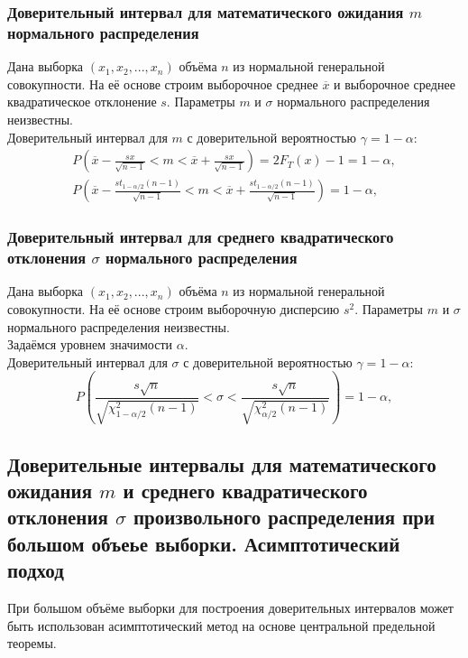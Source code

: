 	\subsubsection {Доверительный интервал для математического ожидания $m$ нормального распределения}
		Дана выборка $(x_1, x_2, ..., x_n)$ объёма $n$ из нормальной генеральной совокупности. На её основе строим выборочное среднее $\overline x$ и выборочное среднее квадратическое отклонение $s$. Параметры $m$ и $\sigma$ нормального распределения неизвестны.\\
		Доверительный интервал для $m$ с доверительной вероятностью $\gamma = 1 - \alpha$:\\
		\begin{eqnarray}
			P\left(\overline x - \frac{sx}{\sqrt{n - 1}} < m < \overline x + \frac{sx}{\sqrt{n - 1}}\right) = 2F_T(x) - 1 = 1 - \alpha, \\ \nonumber
			P\left(\overline x - \frac{st_{1 - \alpha/2}(n - 1)}{\sqrt{n - 1}} < m < \overline x + \frac{st_{1 - \alpha/2}(n - 1)}{\sqrt{n - 1}} \right) = 1 - \alpha,
		\end{eqnarray}

	\subsubsection {Доверительный интервал для среднего квадратического отклонения $\sigma$ нормального распределения}
		Дана выборка $(x_1, x_2, ..., x_n)$ объёма $n$ из нормальной генеральной совокупности. На её основе строим выборочную дисперсию $s^2$. Параметры $m$ и $\sigma$ нормального распределения неизвестны.\\
		Задаёмся уровнем значимости $\alpha.$\\
		Доверительный интервал для $\sigma$ с доверительной вероятностью $\gamma = 1 - \alpha$:\\
		\begin{equation} P\left( \frac{s\sqrt{n}}{\sqrt{\chi^2_{1-\alpha/2}(n - 1)}} < \sigma < \frac{s\sqrt{n}}{\sqrt{\chi^2_{\alpha/2}(n - 1)}}\right) = 1 - \alpha, \end{equation} 

\subsection {Доверительные интервалы для математического ожидания $m$ и среднего квадратического отклонения $\sigma$ произвольного распределения при большом объеье выборки. Асимптотический подход}
	При большом объёме выборки для построения доверительных интервалов может быть использован асимптотический метод на основе центральной предельной теоремы.

